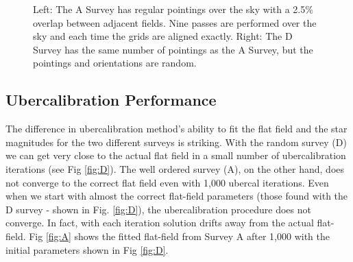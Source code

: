 \documentclass[12pt,a4paper,twoside]{article}
\begin{document}
\begin{figure}[ht]
\centering
{}
\caption{Left: The A Survey has regular pointings over the sky with a 2.5\% overlap between adjacent fields. Nine passes are performed over the sky and each time the grids are aligned exactly. Right: The D Survey has the same number of pointings as the A Survey, but the pointings and orientations are random.\label{fig:surveys}}
\end{figure}

\subsection{Ubercalibration Performance}

The difference in ubercalibration method's ability to fit the flat field and the star magnitudes for the two different surveys is striking. With the random survey (D) we can get very close to the actual flat field in a small number of ubercalibration iterations (see Fig \ref{fig:D}). The well ordered survey (A), on the other hand, does not converge to the correct flat field even with 1,000 ubercal iterations. Even when we start with almost the correct flat-field parameters (those found with the D survey - shown in Fig. \ref{fig:D}), the ubercalibration procedure does not converge. In fact, with each iteration solution drifts away from the actual flat-field. Fig \ref{fig:A} shows the fitted flat-field from Survey A after 1,000 with the initial parameters shown in Fig \ref{fig:D}.
\end{document}

